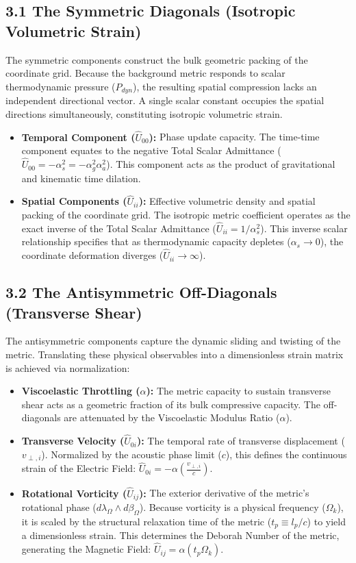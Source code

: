 \subsection*{3.1 The Symmetric Diagonals (Isotropic Volumetric Strain)}
The symmetric components construct the bulk geometric packing of the coordinate grid. Because the background metric responds to scalar thermodynamic pressure ($P_{dyn}$), the resulting spatial compression lacks an independent directional vector. A single scalar constant occupies the spatial directions simultaneously, constituting isotropic volumetric strain. 
\begin{itemize}[leftmargin=*]
    \item \textbf{Temporal Component ($\hat{U}_{00}$):} Phase update capacity. The time-time component equates to the negative Total Scalar Admittance ($\hat{U}_{00} = -\alpha_s^2 = -\alpha_g^2 \alpha_a^2$). This component acts as the product of gravitational and kinematic time dilation. 
    \item \textbf{Spatial Components ($\hat{U}_{ii}$):} Effective volumetric density and spatial packing of the coordinate grid. The isotropic metric coefficient operates as the exact inverse of the Total Scalar Admittance ($\hat{U}_{ii} = 1/\alpha_s^2$). This inverse scalar relationship specifies that as thermodynamic capacity depletes ($\alpha_s \to 0$), the coordinate deformation diverges ($\hat{U}_{ii} \to \infty$). 
\end{itemize}

\subsection*{3.2 The Antisymmetric Off-Diagonals (Transverse Shear)}
The antisymmetric components capture the dynamic sliding and twisting of the metric. Translating these physical observables into a dimensionless strain matrix is achieved via normalization:
\begin{itemize}
    \item \textbf{Viscoelastic Throttling ($\alpha$):} The metric capacity to sustain transverse shear acts as a geometric fraction of its bulk compressive capacity. The off-diagonals are attenuated by the Viscoelastic Modulus Ratio ($\alpha$).
    \item \textbf{Transverse Velocity ($\hat{U}_{0i}$):} The temporal rate of transverse displacement ($v_{\perp, i}$). Normalized by the acoustic phase limit ($c$), this defines the continuous strain of the Electric Field: $\hat{U}_{0i} = -\alpha \left( \frac{v_{\perp, i}}{c} \right)$.
    \item \textbf{Rotational Vorticity ($\hat{U}_{ij}$):} The exterior derivative of the metric's rotational phase ($d\lambda_\Omega \wedge d\beta_\Omega$). Because vorticity is a physical frequency ($\Omega_k$), it is scaled by the structural relaxation time of the metric ($t_p \equiv l_p/c$) to yield a dimensionless strain. This determines the Deborah Number of the metric, generating the Magnetic Field: $\hat{U}_{ij} = \alpha (t_p \Omega_k)$. 
\end{itemize}

